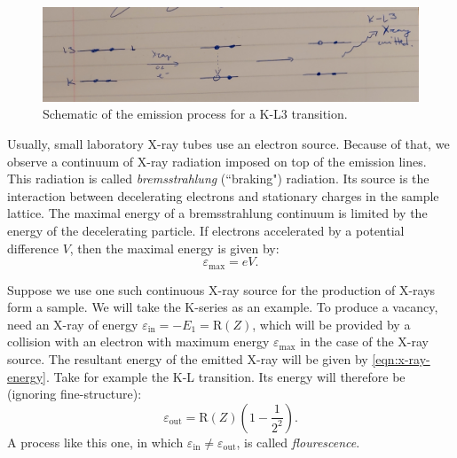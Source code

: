 \documentclass[11pt,a4paper,twoside,onecolumn]{article}
\newcommand{\rydberg}{\mathrm{R}}
\begin{document}
\begin{figure}[!htbp]
    \centering
    \includegraphics[width=\textwidth]{img/emission-diagram.png}
    \caption{Schematic of the emission process for a K-L3 transition.}\label{fig:emission-diagram}
\end{figure}

Usually, small laboratory X-ray tubes use an electron source. Because of that, we observe a continuum of X-ray radiation imposed on top of the emission lines. This radiation is called \emph{bremsstrahlung} (``braking") radiation. Its source is the interaction between decelerating electrons and stationary charges in the sample lattice. The maximal energy of a bremsstrahlung continuum is limited by the energy of the decelerating particle. If electrons accelerated by a potential difference $V$, then the maximal energy is given by: 
\begin{equation}\label{eqn:bremss-energy-max}
    \varepsilon_\mathrm{max} = eV.
\end{equation}

Suppose we use one such continuous X-ray source for the production of X-rays form a sample. We will take the K-series as an example. To produce a vacancy, need an X-ray of energy $\varepsilon_\mathrm{in} = - E_1 = \rydberg(Z)$, which will be provided by a collision with an electron with maximum energy $\varepsilon_\mathrm{max}$ in the case of the X-ray source. The resultant energy of the emitted X-ray will be given by \eqref{eqn:x-ray-energy}. Take for example the K-L transition. Its energy will therefore be (ignoring fine-structure):
\begin{equation}\label{eqn:Kalpha-energy-out}
    \varepsilon_\mathrm{out} = \rydberg\left(Z\right) \left(1 - \frac{1}{2^2}\right).
\end{equation}
A process like this one, in which $\varepsilon_\mathrm{in} \neq \varepsilon_\mathrm{out}$, is called \emph{flourescence}.
\end{document}

